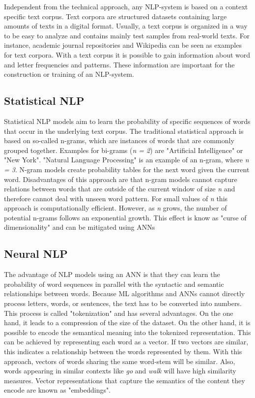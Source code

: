 Independent from the technical approach, any \ac{NLP}-system is based on a context specific text corpus. Text corpora are structured datasets containing large amounts of texts in a digital format. Usually, a text corpus is organized in a way to be easy to analyze and contains mainly test samples from real-world texts. For instance, academic journal repositories and Wikipedia can be seen as examples for text corpora. With a text corpus it is possible to gain information about word and letter frequencies and patterns. These information are important for the construction or training of an \ac{NLP}-system.
\cite{church1995commercial,vzivzka2019text}

\subsection{Statistical NLP}
Statistical \ac{NLP} models aim to learn the probability of specific sequences of words that occur in the underlying text corpus.
The traditional statistical approach is based on so-called n-grams, which are instances of words that are commonly grouped together. Examples for bi-grams (\textit{n = 2}) are "Artificial Intelligence" or "New York". "Natural Language Processing" is an example of an n-gram, where \textit{n = 3}. N-gram models create probability tables for the next word given the current word. Disadvantages of this approach are that n-gram models cannot capture relations between words that are outside of the current window of size \textit{n} and therefore cannot deal with unseen word pattern. For small values of \textit{n} this approach is computationally efficient. However, as \textit{n} grows, the number of potential n-grams follows an exponential growth. This effect is know as "curse of dimensionality" and can be mitigated using \acp{ANN}
\cite{bengio,vzivzka2019text}

\subsection{Neural NLP}
The advantage of \ac{NLP} models using an \ac{ANN} is that they can learn the probability of word sequences in parallel with the syntactic and semantic relationships between words. 
Because \ac{ML} algorithms and \acp{ANN} cannot directly process letters, words, or sentences, the text has to be converted into numbers. This process is called "tokenization" and has several advantages. On the one hand, it leads to a compression of the size of the dataset. On the other hand, it is possible to encode the semantical meaning into the tokenized representation. This can be achieved by representing each word as a vector. If two vectors are similar, this indicates a relationship between the words represented by them. With this approach, vectors of words sharing the same word-stem will be similar. Also, words appearing in similar contexts like \textit{go} and \textit{walk} will have high similarity measures. Vector representations that capture the semantics of the content they encode are known as "embeddings".
\cite{bengio,vzivzka2019text}

